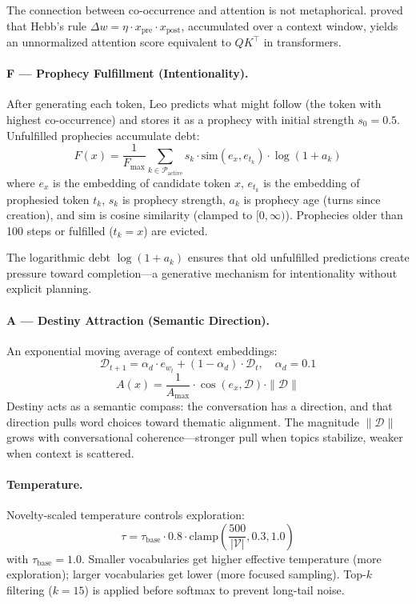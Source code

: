 \documentclass[11pt,twocolumn]{article}
\begin{document}
The connection between co-occurrence and attention is not metaphorical. \citet{whittington2024hebbian} proved that Hebb's rule $\Delta w = \eta \cdot x_{\text{pre}} \cdot x_{\text{post}}$, accumulated over a context window, yields an unnormalized attention score equivalent to $QK^\top$ in transformers.

\paragraph{F --- Prophecy Fulfillment (Intentionality).}
After generating each token, Leo predicts what might follow (the token with highest co-occurrence) and stores it as a prophecy with initial strength $s_0 = 0.5$. Unfulfilled prophecies accumulate debt:
\begin{equation}
  F(x) = \frac{1}{F_{\max}} \sum_{k \in \mathcal{P}_{\text{active}}} s_k \cdot \text{sim}(e_x, e_{t_k}) \cdot \log(1 + a_k)
\end{equation}
where $e_x$ is the embedding of candidate token $x$, $e_{t_k}$ is the embedding of prophesied token $t_k$, $s_k$ is prophecy strength, $a_k$ is prophecy age (turns since creation), and $\text{sim}$ is cosine similarity (clamped to $[0, \infty)$). Prophecies older than 100 steps or fulfilled ($t_k = x$) are evicted.

The logarithmic debt $\log(1 + a_k)$ ensures that old unfulfilled predictions create pressure toward completion---a generative mechanism for intentionality without explicit planning.

\paragraph{A --- Destiny Attraction (Semantic Direction).}
An exponential moving average of context embeddings:
\begin{equation}
  \mathcal{D}_{t+1} = \alpha_d \cdot e_{w_t} + (1 - \alpha_d) \cdot \mathcal{D}_t, \quad \alpha_d = 0.1
\end{equation}
\begin{equation}
  A(x) = \frac{1}{A_{\max}} \cdot \cos(e_x, \mathcal{D}) \cdot \|\mathcal{D}\|
\end{equation}
Destiny acts as a semantic compass: the conversation has a direction, and that direction pulls word choices toward thematic alignment. The magnitude $\|\mathcal{D}\|$ grows with conversational coherence---stronger pull when topics stabilize, weaker when context is scattered.

\paragraph{Temperature.}
Novelty-scaled temperature controls exploration:
\begin{equation}
  \tau = \tau_{\text{base}} \cdot 0.8 \cdot \text{clamp}\!\left(\frac{500}{|\mathcal{V}|}, 0.3, 1.0\right)
\end{equation}
with $\tau_{\text{base}} = 1.0$. Smaller vocabularies get higher effective temperature (more exploration); larger vocabularies get lower (more focused sampling). Top-$k$ filtering ($k = 15$) is applied before softmax to prevent long-tail noise.
\end{document}
